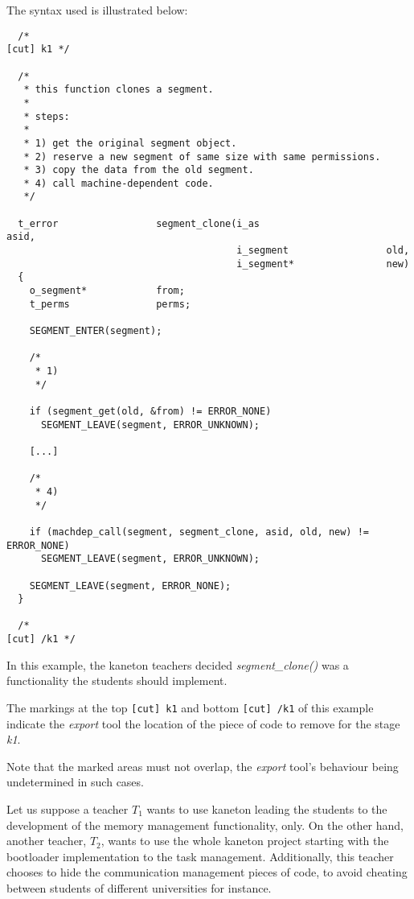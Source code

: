 The syntax used is illustrated below:

\begin{verbatim}
  /*                                                                [cut] k1 */

  /*
   * this function clones a segment.
   *
   * steps:
   *
   * 1) get the original segment object.
   * 2) reserve a new segment of same size with same permissions.
   * 3) copy the data from the old segment.
   * 4) call machine-dependent code.
   */

  t_error                 segment_clone(i_as                      asid,
                                        i_segment                 old,
                                        i_segment*                new)
  {
    o_segment*            from;
    t_perms               perms;

    SEGMENT_ENTER(segment);

    /*
     * 1)
     */

    if (segment_get(old, &from) != ERROR_NONE)
      SEGMENT_LEAVE(segment, ERROR_UNKNOWN);

    [...]

    /*
     * 4)
     */

    if (machdep_call(segment, segment_clone, asid, old, new) != ERROR_NONE)
      SEGMENT_LEAVE(segment, ERROR_UNKNOWN);

    SEGMENT_LEAVE(segment, ERROR_NONE);
  }

  /*                                                               [cut] /k1 */
\end{verbatim}

In this example, the kaneton teachers decided \textit{segment\_clone()}
was a functionality the students should implement.

The markings at the top \verb|[cut] k1| and bottom \verb|[cut] /k1| of this
example indicate the \textit{export} tool the location of the piece of code
to remove for the stage \textit{k1}.

Note that the marked areas must not overlap, the \textit{export} tool's
behaviour being undetermined in such cases.

Let us suppose a teacher $T_{1}$ wants to use kaneton leading the students to
the development of the memory management functionality, only. On the other
hand, another teacher, $T_{2}$, wants to use the whole kaneton project starting
with the bootloader implementation to the task management. Additionally,
this teacher chooses to hide the communication management pieces of code,
to avoid cheating between students of different universities for instance.

